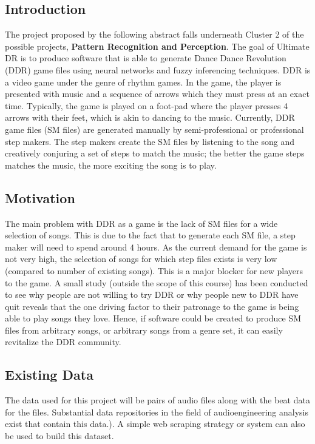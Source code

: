 \subsection{Introduction}
The project proposed by the following abstract falls underneath Cluster 2 of the possible projects, \textbf{Pattern Recognition and
Perception}. The goal of Ultimate DR is to produce software that is able to generate Dance Dance Revolution (DDR) game
files using neural networks and fuzzy inferencing techniques.
DDR is a video game under the genre of rhythm games. In the game,
the player is presented with music and a sequence of arrows which they must press at an exact
time. Typically, the game is played on a foot-pad where the player presses 4 arrows with their
feet, which is akin to dancing to the music. Currently, DDR game files (SM files) are generated
manually by semi-professional or professional step makers. The step makers create the SM files
by listening to the song and creatively conjuring a set of steps to match the music; the better
the game steps matches the music, the more exciting the song is to play.


\subsection{Motivation}
The main problem with DDR as a game is the lack of SM files for a wide selection of songs. This
is due to the fact that to generate each SM file, a step maker will need to spend around 4 hours.
As the current demand for the game is not very high, the selection of songs for which step files
exists is very low (compared to number of existing songs). This is a major blocker for new
players to the game. A small study (outside the scope of this course) has been conducted to see
why people are not willing to try DDR or why people new to DDR have quit reveals that the one
driving factor to their patronage to the game is being able to play songs they love. Hence, if
software could be created to produce SM files from arbitrary songs, or arbitrary songs from a
genre set, it can easily revitalize the DDR community.

\subsection{Existing Data}
The data used for this project will be pairs of audio files along with the beat data for the files. Substantial data repositories in the field of audioengineering analysis exist that contain this data.). A simple web scraping strategy or system can also be used to build this dataset. 

